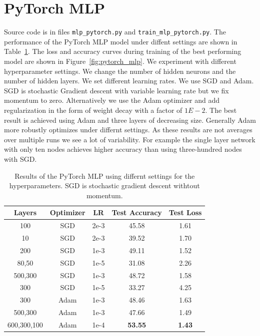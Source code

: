 \documentclass{article}
\newcommand\·{\ensuremath{\cdot}}
\newcommand\…{\ensuremath{\dots}}
\newcommand{\⇔}{\ensuremath{\iff}}
\newcommand{\⇐}{\ensuremath{\impliedby}}
\newcommand{\⇒}{\ensuremath{\implies}}
\newcommand\1{\ensuremath{\mathds{1}}}
\newcommand\ℝ{\ensuremath{\mathds{R}}}
\begin{document}
\section{PyTorch MLP}
Source code is in files \texttt{mlp\_pytorch.py} and \texttt{train\_mlp\_pytorch.py}.
The performance of the PyTorch MLP model under diffent settings are shown in Table~\ref{tab:pytorch_mlp}.
The loss and accuracy curves during training of the best performing model are shown in Figure~\ref{fig:pytorch_mlp}.
We experiment with different hyperparameter settings. We change the number of hidden neurons and the number of hidden layers.
We set different learning rates.
We use SGD and Adam.
SGD is stochastic Gradient descent with variable learning rate but we fix momentum to zero.
Alternatively we use the Adam optimizer and add regularization in the form of weight decay with a factor of $1E-2$.
The best result is achieved using Adam and three layers of decreasing size.
Generally Adam more robustly optimizes under differnt settings.
As these results  are not averages over multiple runs we see a lot of variability.
For example the single layer network with only ten nodes achieves higher accuracy than using three-hundred nodes with SGD.

\begin{table}
  \centering
  \begin{tabular}{ccccc}
    Layers & Optimizer & LR & Test Accuracy & Test Loss\\\toprule
    100         & SGD  & 2e-3 & 45.58 & 1.61\\
    10          & SGD  & 2e-3 & 39.52 & 1.70\\
    200         & SGD  & 1e-3 & 49.11 & 1.52\\
    80,50       & SGD  & 1e-5 & 31.08 & 2.26\\
    500,300     & SGD  & 1e-3 & 48.72 & 1.58 \\
    300         & SGD  & 1e-5 & 33.27 & 4.25\\
    300         & Adam & 1e-3 & 48.46 & 1.63\\
    500,300     & Adam & 1e-3 & 47.66 & 1.49\\
    600,300,100 & Adam & 1e-4 & \textbf{53.55} & \textbf{1.43}\\
  \end{tabular}
  \caption{Results of the PyTorch MLP using differnt settings for the hyperparameters. SGD is stochastic gradient descent withtout momentum.}
  \label{tab:pytorch_mlp}
\end{table}
\end{document}
